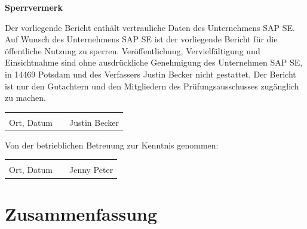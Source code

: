 \documentclass[
	12pt, %
	a4paper,
	bibliography=totoc, %
	numbers=noenddot, %
	ngerman, %
	headsepline, %
	oneside %
	]{scrbook} %
\newcommand{\studentName}{Justin Becker}
\newcommand{\betreuerUnt}{Jenny Peter}
\newenvironment*{dontcount}{}{}
\begin{document}
\maketitle

\onehalfspacing

\begin{dontcount}
\textbf{Sperrvermerk}

Der vorliegende Bericht enthält vertrauliche Daten des Unternehmens SAP SE.
Auf Wunsch des Unternehmens SAP SE ist der vorliegende Bericht für die öffentliche Nutzung zu sperren.
Veröffentlichung, Vervielfältigung und Einsichtnahme sind ohne ausdrückliche Genehmigung des Unternehmen SAP SE, in 14469 Potsdam und des Verfassers Justin Becker nicht gestattet.
Der Bericht ist nur den Gutachtern und den Mitgliedern des Prüfungsausschusses zugänglich zu machen.

\vspace{20mm}

\begin{tabular}{lp{2em}l} 
    \hspace{4cm}   && \hspace{4cm} \\\cline{1-1}\cline{3-3} 
    Ort, Datum     && \studentName{}
\end{tabular}

\vspace{\fill}
\normalsize{Von der betrieblichen Betreuung zur Kenntnis genommen:}
\vspace*{20mm}

\begin{tabular}{lp{2em}l} 
    \hspace{4cm}   && \hspace{4cm} \\\cline{1-1}\cline{3-3} 
    Ort, Datum     && \betreuerUnt
\end{tabular}

\end{dontcount}


\chapter*{Zusammenfassung}

\end{document}
